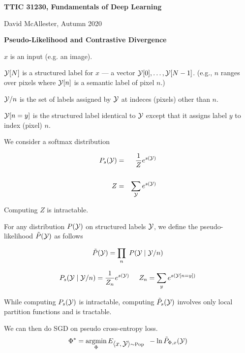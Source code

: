 




{\Huge

  \centerline{\bf TTIC 31230, Fundamentals of Deep Learning}
  \bigskip
  \centerline{David McAllester, Autumn 2020}
  \vfill
  \vfill
  \centerline{\bf Pseudo-Likelihood and Contrastive Divergence}
\vfill
\vfill
\vfill


$x$ is an input (e.g. an image).

\vfill
${\cal Y} [N]$ is a structured label for $x$ --- a vector ${\cal Y}[0],\ldots,{\cal Y}[N-1]$. (e.g., $n$ ranges over pixels where ${\cal Y}[n]$ is a semantic label of pixel $n$.)

\vfill
${\cal Y}/n$ is the set of labels assigned by ${\cal Y}$ at indeces (pixels) other than $n$.

\vfill
${\cal Y}[n=y]$ is the structured label identical to ${\cal Y}$ except that it assigns label $y$ to index (pixel) $n$.


\vfill
We consider a softmax distribution

\vfill
\begin{eqnarray*}
P_s({\cal Y}) & = & \frac{1}{Z}e^{s({\cal Y})} \\
\\
Z & = & \sum_{\cal Y} e^{s({\cal Y})}
\end{eqnarray*}

\vfill
Computing $Z$ is intractable.


For any distribution $P({\cal Y})$ on structured labels ${\cal Y}$,
we define the {\color{red} pseudo-likelihood}  $\tilde{P}({\cal Y})$ as follows

{\color{red} $$\tilde{P}({\cal Y}) = \prod_n\;P({\cal Y}\;|\; {\cal Y}/n)$$}

\vfill
$$P_s({\cal Y}\;|\;{\cal Y}/n) = \frac{1}{Z_n}e^{s({\cal Y})}\;\;\;\;\;Z_n = \sum_{y} e^{s({\cal Y}[n=y])}$$

\vfill
While computing $P_s({\cal Y})$ is intractable, computing $\tilde{P}_s({\cal Y})$ involves only local partition functions and is tractable.


We can then do SGD on pseudo cross-entropy loss.
\vfill
{\color{red} $$\Phi^* = \operatorname*{argmin}_\Phi E_{{\mbox{$\langle x,{\cal Y}\rangle$}} \sim \mathrm{Pop}}\;\;-\ln \tilde{P}_{\Phi,x}({\cal Y})$$}

}
